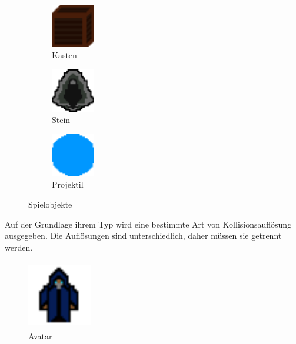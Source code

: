 \documentclass[
  10pt,
  a4paper,
  oneside,
  headers,
  headinclude,
  footinclude,
  BCOR5mm,
]{article}
\begin{document}
\begin{figure}[h]
  \begin{subfigure}{0.3\textwidth}
    \includegraphics[width=0.5\linewidth, height=1.9cm]{Box}
    \caption{Kasten}
    \label{fig:Kasten}
  \end{subfigure}
  \begin{subfigure}{0.3\textwidth}
    \includegraphics[width=0.5\linewidth, height=1.9cm]{Stone}
    \caption{Stein}
    \label{fig:Stein}
  \end{subfigure}
  \begin{subfigure}{0.3\textwidth}
    \includegraphics[width=0.5\linewidth, height=1.9cm]{frostbolt}
    \caption{Projektil}
    \label{fig:Projektil}
  \end{subfigure}

  \caption{Spielobjekte}
  \label{fig:Spielobjekte}
\end{figure}

Auf der Grundlage ihrem Typ wird eine bestimmte Art von Kollisionsauflösung
ausgegeben. Die Auflösungen sind unterschiedlich, daher müssen sie getrennt
werden.

\newpage %
\begin{figure}
    \centering
    \includegraphics[width=0.25\textwidth, height=3cm]{MageCHaracter}
    \caption{Avatar}
    \label{fig:Avatar}
\end{figure}
\end{document}
